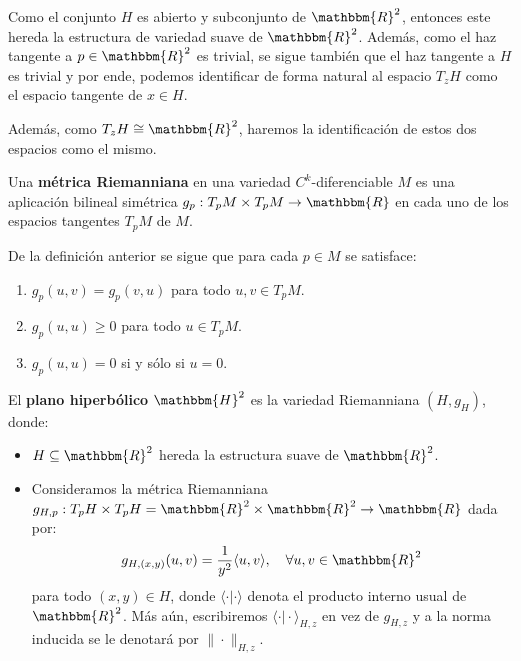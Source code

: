 \documentclass[12pt]{report}
\theoremstyle{largebreak}
\newcommand\cf[3]{\ensuremath{#1:#2\rightarrow#3}}
\newcommand{\bbm}[1]{\ensuremath{\mathbbm{#1}}}
\newcommand{\norm}[1]{\|#1\|}
\begin{document}
    Como el conjunto $H$ es abierto y subconjunto de $\bbm{R}^2$, entonces este hereda la estructura de variedad suave de $\bbm{R}^2$. Además, como el haz tangente a $p\in\bbm{R}^2$ es trivial, se sigue también que el haz tangente a $H$ es trivial y por ende, podemos identificar de forma natural al espacio $T_zH$ como el espacio tangente de $x\in H$.

    Además, como $T_zH\cong\bbm{R}^2$, haremos la identificación de estos dos espacios como el mismo.

    \begin{mydef}
        Una \textbf{métrica Riemanniana} en una variedad $C^k$-diferenciable $M$ es una aplicación bilineal simétrica $\cf{g_p}{T_pM\times T_pM}{\bbm{R}}$ en cada uno de los espacios tangentes $T_pM$ de $M$.
    \end{mydef}

    \begin{obs}
        De la definición anterior se sigue que para cada $p\in M$ se satisface:
        \begin{enumerate}[label = \textit{(\arabic*)}]
            \item $g_p(u,v)=g_p(v,u)$ para todo $u,v\in T_pM$.
            \item $g_p(u,u)\geq0$ para todo $u\in T_pM$.
            \item $g_p(u,u)=0$ si y sólo si $u=0$.
        \end{enumerate}
    \end{obs}

    \begin{mydef}
        El \textbf{plano hiperbólico} $\bbm{H}^2$ es la variedad Riemanniana $(H,g_H)$, donde:
        \begin{itemize}
            \item $H\subseteq\bbm{R}^2$ hereda la estructura suave de $\bbm{R}^2$.
            \item Consideramos la métrica Riemanniana $\cf{g_{H,p}}{T_pH\times T_pH=\bbm{R}^2\times \bbm{R}^2}{\bbm{R}}$ dada por:
            \begin{equation*}
                g_{H,(x,y)}(u,v)=\frac{1}{y^2}\langle u,v\rangle,\quad\forall u,v\in\bbm{R}^2
            \end{equation*}
            para todo $(x,y)\in H$, donde $\langle\cdot\big|\cdot \rangle$ denota el producto interno usual de $\bbm{R}^2$. Más aún, escribiremos $\langle\cdot\big|\cdot \rangle_{ H,z}$ en vez de $g_{H,z}$ y a la norma inducida se le denotará por $\norm{\cdot}_{H,z}$.
        \end{itemize}
    \end{mydef}
\end{document}
